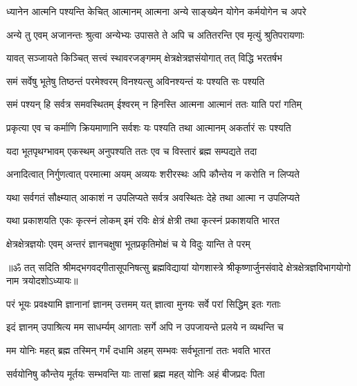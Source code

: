 \twolineshloka
{ध्यानेन आत्मनि पश्यन्ति केचित् आत्मानम् आत्मना}
{अन्ये साङ्ख्येन योगेन कर्मयोगेन च अपरे}%

\twolineshloka
{अन्ये तु एवम् अजानन्तः श्रुत्वा अन्येभ्यः उपासते}
{ते अपि च अतितरन्ति एव मृत्युं श्रुतिपरायणाः}%

\twolineshloka
{यावत् सञ्जायते किञ्चित् सत्त्वं स्थावरजङ्गमम्}
{क्षेत्रक्षेत्रज्ञसंयोगात् तत् विद्धि भरतर्षभ}%

\twolineshloka
{समं सर्वेषु भूतेषु तिष्ठन्तं परमेश्वरम्}
{विनश्यत्सु अविनश्यन्तं यः पश्यति सः पश्यति}%

\twolineshloka
{समं पश्यन् हि सर्वत्र समवस्थितम् ईश्वरम्}
{न हिनस्ति आत्मना आत्मानं ततः याति परां गतिम्}%

\twolineshloka
{प्रकृत्या एव च कर्माणि क्रियमाणानि सर्वशः}
{यः पश्यति तथा आत्मानम् अकर्तारं सः पश्यति}%

\twolineshloka
{यदा भूतपृथग्भावम् एकस्थम् अनुपश्यति}
{ततः एव च विस्तारं ब्रह्म सम्पद्यते तदा}%

\twolineshloka
{अनादित्वात् निर्गुणत्वात् परमात्मा अयम् अव्ययः}
{शरीरस्थः अपि कौन्तेय न करोति न लिप्यते}%

\twolineshloka
{यथा सर्वगतं सौक्ष्म्यात् आकाशं न उपलिप्यते}
{सर्वत्र अवस्थितः देहे तथा आत्मा न उपलिप्यते}%

\twolineshloka
{यथा प्रकाशयति एकः कृत्स्नं लोकम् इमं रविः}
{क्षेत्रं क्षेत्री तथा कृत्स्नं प्रकाशयति भारत}%

\twolineshloka
{क्षेत्रक्षेत्रज्ञयोः एवम् अन्तरं ज्ञानचक्षुषा}
{भूतप्रकृतिमोक्षं च ये विदुः यान्ति ते परम्}%

{॥ॐ तत् सदिति श्रीमद्भगवद्गीतासूपनिषत्सु ब्रह्मविद्यायां योगशास्त्रे श्रीकृष्णार्जुनसंवादे क्षेत्रक्षेत्रज्ञविभागयोगो नाम त्रयोदशोऽध्यायः॥}



\twolineshloka
{परं भूयः प्रवक्ष्यामि ज्ञानानां ज्ञानम् उत्तमम्}
{यत् ज्ञात्वा मुनयः सर्वे परां सिद्धिम् इतः गताः}%

\twolineshloka
{इदं ज्ञानम् उपाश्रित्य मम साधर्म्यम् आगताः}
{सर्गे अपि न उपजायन्ते प्रलये न व्यथन्ति च}%

\twolineshloka
{मम योनिः महत् ब्रह्म तस्मिन् गर्भं दधामि अहम्}
{सम्भवः सर्वभूतानां ततः भवति भारत}%

\twolineshloka
{सर्वयोनिषु कौन्तेय मूर्तयः सम्भवन्ति याः}
{तासां ब्रह्म महत् योनिः अहं बीजप्रदः पिता}%

